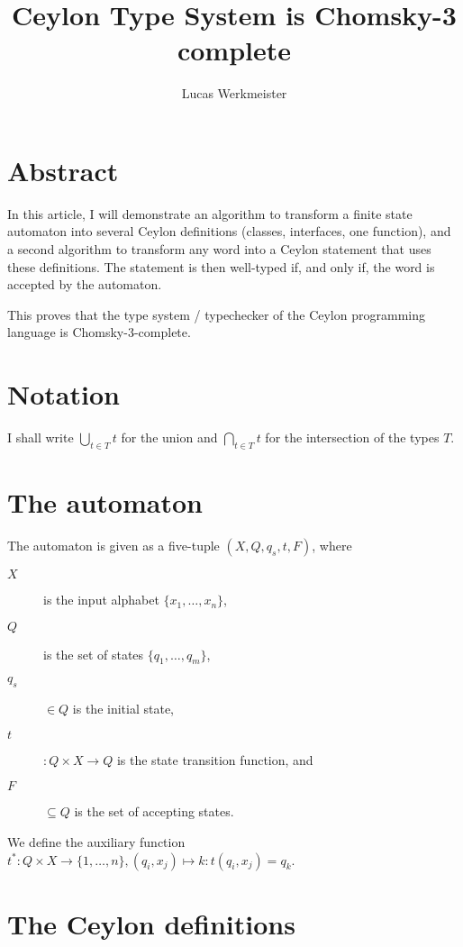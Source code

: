 \documentclass[a4paper, 11pt]{article}
\begin{document}
\author{Lucas Werkmeister}
\title{Ceylon Type System is Chomsky-3 complete}

\maketitle
\tableofcontents

\section{Abstract}

In this article, I will demonstrate an algorithm to transform a finite state automaton into several Ceylon definitions (classes, interfaces, one function), and a second algorithm to transform any word into a Ceylon statement that uses these definitions.
The statement is then well-typed if, and only if, the word is accepted by the automaton.

This proves that the type system / typechecker of the Ceylon programming language is Chomsky-3-complete.

\section{Notation}

I shall write $\bigcup\limits_{t\in T}t$ for the union and $\bigcap\limits_{t\in T}t$ for the intersection of the types $T$.

\section{The automaton}

The automaton is given as a five-tuple $(X,Q,q_s,t,F)$, where
\begin{description}
\item[$X$] is the input alphabet $\{x_1,\ldots,x_n\}$,
\item[$Q$] is the set of states $\{q_1,\ldots,q_m\}$,
\item[$q_s$] $\in Q$ is the initial state,
\item[$t$]$: Q\times X\to Q$ is the state transition function, and
\item[$F$] $\subseteq Q$ is the set of accepting states.
\end{description}

We define the auxiliary function $t^\ast: Q\times X\to\{1,\ldots,n\}, (q_i, x_j) \mapsto k: t(q_i, x_j) = q_k$.

\section{The Ceylon definitions}
\end{document}
